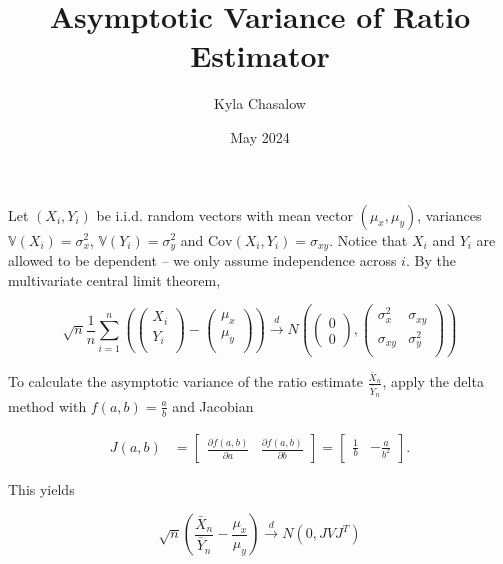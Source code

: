 \documentclass{article}
\title{Asymptotic Variance of Ratio Estimator}
\author{Kyla Chasalow}
\date{May 2024}
\newcommand{\Var}{\mathbb{V}}
\newcommand{\Cov}{\mbox{Cov}}
\theoremstyle{definition}
\begin{document}
\maketitle



Let $(X_i,Y_i)$ be i.i.d. random vectors with mean vector $(\mu_x,\mu_y)$, variances $\Var(X_i)=\sigma_x^2$, $\Var(Y_i)=\sigma_y^2$ and $\Cov(X_i,Y_i)=\sigma_{xy}$. Notice that $X_i$ and $Y_i$ are allowed to be dependent -- we only assume independence across $i$. By the multivariate central limit theorem, 

\begin{equation*} \sqrt{n} \frac{1}{n}\sum_{i=1}^{n}
    \left(\left(\begin{array}{c}
        X_i  \\
        Y_i  \\ 
    \end{array}\right) - \left(\begin{array}{c}
        \mu_x  \\
        \mu_y  \\ 
    \end{array}\right)\right) \xrightarrow{d}
    N\left(\left(\begin{array}{c}
        0  \\
        0 
    \end{array}\right),\left(\begin{array}{cc}
        \sigma_x^2  &  \sigma_{xy} \\
        \sigma_{xy} & \sigma_y^2 \\
    \end{array}\right)\right)
\end{equation*}

To calculate the asymptotic variance of the ratio estimate $\frac{\bar{X}_n}{\bar{Y}_n}$, apply the delta method with $f(a,b)=\frac{a}{b}$ and Jacobian

\begin{align*} 
J(a,b) &= \begin{bmatrix}
\frac{\partial f(a,b) }{\partial a} & \frac{\partial f(a,b) }{\partial b}
\end{bmatrix} = \begin{bmatrix}
\frac{1}{b} &  -\frac{a}{b^2}
\end{bmatrix}.
\end{align*}  

This yields

\begin{equation*}
\sqrt{n}\left(\frac{\bar{X}_n}{\bar{Y}_n} - \frac{\mu_x}{\mu_y}\right) \xrightarrow{d} N(0, JVJ^T)
\end{equation*}
\end{document}
